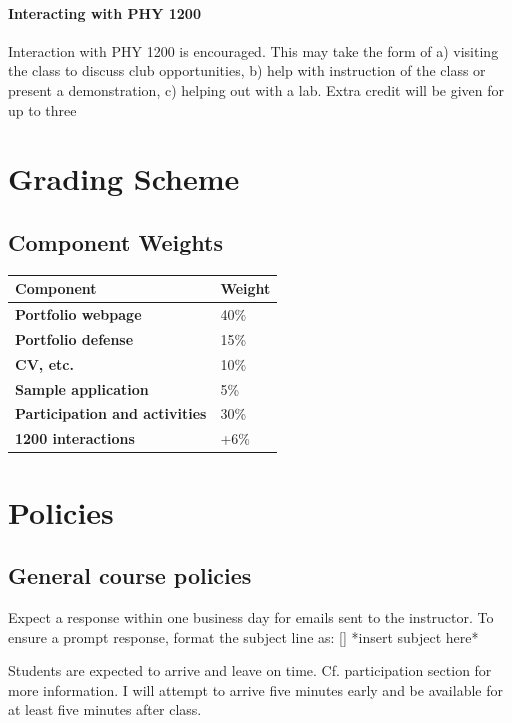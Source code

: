 \documentclass{syllabus}
\begin{document}
\paragraph{Interacting with PHY 1200} Interaction with PHY 1200 is encouraged. This may take the form of a) visiting the class to discuss club opportunities, b) help with instruction of the class or present a demonstration, c) helping out with a lab. Extra credit will be given for up to three


\section*{Grading Scheme}
\subsection*{Component Weights}

\noindent\begin{tabular}{ll}
\textbf{Component} & \textbf{Weight}       \\ \hline
\textbf{Portfolio webpage}            & 40\%  \\
\textbf{Portfolio defense}            & 15\%       \\
\textbf{CV, etc.}            &     10\%   \\
\textbf{Sample application}            & 5\%       \\
\textbf{Participation and activities}            & 30\%       \\
\textbf{1200 interactions}            & +6\%       \\
\end{tabular}%




\section*{Policies}
\subsection{General course policies}
Expect a response within one business day for emails sent to the instructor. To ensure a prompt response, format the subject line as: [\coursecode] *insert subject here*

Students are expected to arrive and leave on time. Cf. participation section for more information. I will attempt to arrive five minutes early and be available for at least five minutes after class.

\collegepolicies
\end{document}
